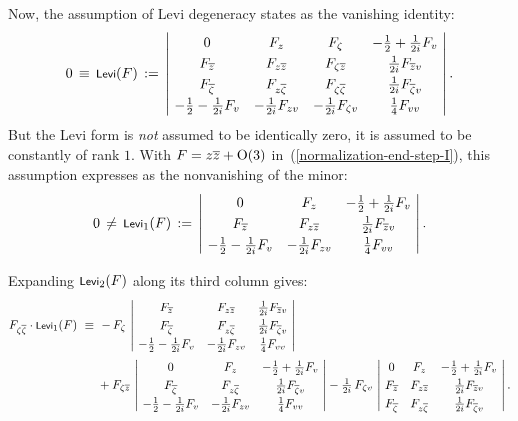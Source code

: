 \documentclass[12pt,twoside,leqno,openany]{amsart}
\begin{document}
Now, the assumption of Levi degeneracy states as the 
vanishing identity:
\[
0
\,\equiv\,
\Levi(F)
\,:=\,
\left\vert\!
\def\arraystretch{1.25}
\begin{array}{cccc}
0 & F_z & F_\zeta & -\frac{1}{2}+\frac{1}{2i}F_v
\\
F_{\overline{z}} & F_{z\overline{z}} & F_{\zeta\overline{z}} &
\frac{1}{2i}F_{\overline{z}v}
\\
F_{\overline{\zeta}} & F_{z\overline{\zeta}} & 
F_{\zeta\overline{\zeta}} &
\frac{1}{2i}F_{\overline{\zeta}v}
\\
-\frac{1}{2}-\frac{1}{2i}F_v & -\frac{1}{2i}F_{zv} &
-\frac{1}{2i}F_{\zeta v} & \frac{1}{4}F_{vv}
\end{array}
\!\right\vert.
\]
But the Levi form is {\em not} assumed to be identically zero,
it is assumed to be constantly of rank $1$. With $F = z \overline{z}
+ {\rm O}(3)$ in~({\ref{normalization-end-step-I}}), 
this assumption
expresses as the nonvanishing of the minor:
\[
0
\,\neq\,
\Levi_1(F)
\,:=\,
\left\vert\!
\def\arraystretch{1.25}
\begin{array}{ccc}
0 & F_z & -\frac{1}{2}+\frac{1}{2i}F_v
\\
F_{\overline{z}} & F_{z\overline{z}} & \frac{1}{2i}F_{\overline{z}v}
\\
-\frac{1}{2}-\frac{1}{2i}F_v & -\frac{1}{2i}F_{zv} & \frac{1}{4}F_{vv}
\end{array}
\!\right\vert.
\]

Expanding $\text{\footnotesize{\sf Levi}}_2(F)$ along its third column gives:
\[
\aligned
F_{\zeta\overline{\zeta}}
\cdot
\Levi_1(F)
&
\,\,\equiv\,\,
-\,F_\zeta\,
\left\vert\!
\def\arraystretch{1.25}
\begin{array}{cccc}
F_{\overline{z}} & F_{z\overline{z}} &
\frac{1}{2i}F_{\overline{z}v}
\\
F_{\overline{\zeta}} & F_{z\overline{\zeta}} & 
\frac{1}{2i}F_{\overline{\zeta}v}
\\
-\frac{1}{2}-\frac{1}{2i}F_v & -\frac{1}{2i}F_{zv} &
\frac{1}{4}F_{vv}
\end{array}
\!\right\vert
\\
&
\ \ \ \ \
+
F_{\zeta\overline{z}}\,
\left\vert\!
\def\arraystretch{1.25}
\begin{array}{cccc}
0 & F_z & -\frac{1}{2}+\frac{1}{2i}F_v
\\
F_{\overline{\zeta}} & F_{z\overline{\zeta}} & 
\frac{1}{2i}F_{\overline{\zeta}v}
\\
-\frac{1}{2}-\frac{1}{2i}F_v & -\frac{1}{2i}F_{zv} &
\frac{1}{4}F_{vv}
\end{array}
\!\right\vert
-
\tfrac{1}{2i}\,
F_{\zeta v}\,
\left\vert\!
\def\arraystretch{1.25}
\begin{array}{cccc}
0 & F_z & -\frac{1}{2}+\frac{1}{2i}F_v
\\
F_{\overline{z}} & F_{z\overline{z}} &
\frac{1}{2i}F_{\overline{z}v}
\\
F_{\overline{\zeta}} & F_{z\overline{\zeta}} & 
\frac{1}{2i}F_{\overline{\zeta}v}
\end{array}
\!\right\vert.
\endaligned
\]
\end{document}
